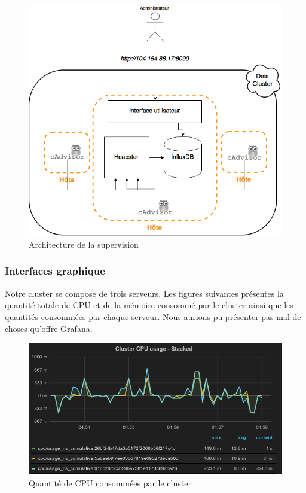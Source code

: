 \begin{onehalfspace}
\begin{figure}[H]
\centering
\includegraphics [scale=0.6]{chapitre4/assets/monitoring-cluster}
\caption{Architecture de la supervision}
\label{fig:}
\end{figure}


\subsubsection{Interfaces graphique}

Notre cluster se compose de trois serveurs. Les figures suivantes présentes la quantité totale de CPU et de la mémoire consommé par le cluster ainsi que les quantités consommées par chaque serveur. Nous aurions pu présenter pas mal de choses qu'offre Grafana.

\begin{figure}[H]
\centering
\includegraphics [scale=0.6]{chapitre4/assets/cluster-cpu}
\caption{Quantité de CPU consommées par le cluster}
\label{fig:}
\end{figure}


\end{onehalfspace}
